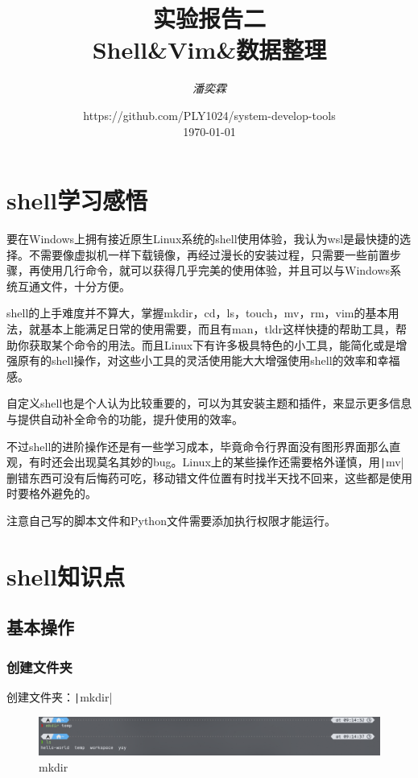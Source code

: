 \documentclass[fontset=ubuntu]{ctexart}
\title{\Huge \textbf{实验报告二 \\ Shell\&Vim\&数据整理}}
\author{\textit{潘奕霖}}
\date{https://github.com/PLY1024/system-develop-tools\\ \today}
\begin{document}
\begin{sloppypar}

\maketitle
\newpage

\tableofcontents
\newpage

\section{shell学习感悟}
要在Windows上拥有接近原生Linux系统的shell使用体验，我认为wsl是最快捷的选择。不需要像虚拟机一样下载镜像，再经过漫长的安装过程，只需要一些前置步骤，再使用几行命令，就可以获得几乎完美的使用体验，并且可以与Windows系统互通文件，十分方便。

shell的上手难度并不算大，掌握mkdir，cd，ls，touch，mv，rm，vim的基本用法，就基本上能满足日常的使用需要，而且有man，tldr这样快捷的帮助工具，帮助你获取某个命令的用法。而且Linux下有许多极具特色的小工具，能简化或是增强原有的shell操作，对这些小工具的灵活使用能大大增强使用shell的效率和幸福感。

自定义shell也是个人认为比较重要的，可以为其安装主题和插件，来显示更多信息与提供自动补全命令的功能，提升使用的效率。

不过shell的进阶操作还是有一些学习成本，毕竟命令行界面没有图形界面那么直观，有时还会出现莫名其妙的bug。Linux上的某些操作还需要格外谨慎，用\texttt|mv|删错东西可没有后悔药可吃，移动错文件位置有时找半天找不回来，这些都是使用时要格外避免的。

注意自己写的脚本文件和Python文件需要添加执行权限才能运行。

\section{shell知识点}
\subsection{基本操作}
\subsubsection{创建文件夹}
创建文件夹：\texttt|mkdir|
\begin{figure}[htb]
    \centering
    \includegraphics[width=0.75\linewidth]{mkdir_1.png}
    \caption{mkdir}
    \label{fig:mkdir_1}
\end{figure}


\end{sloppypar}
\end{document}
